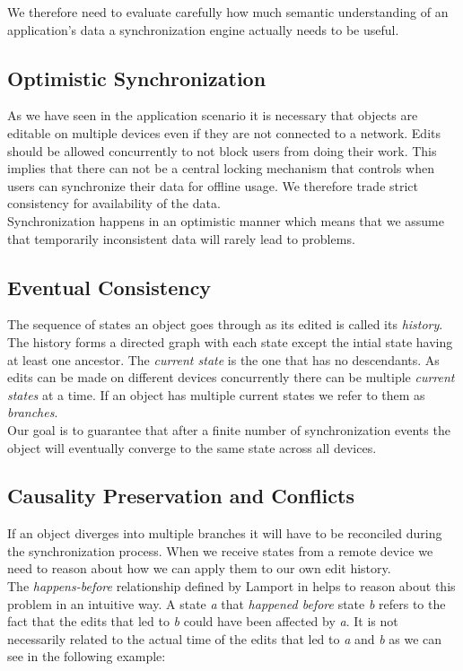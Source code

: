 We therefore need to evaluate carefully how much semantic understanding of an application's data a synchronization engine actually needs to be useful.

\subsection{Optimistic Synchronization}
As we have seen in the application scenario it is necessary that objects are editable on multiple devices even if they are not connected to a network. Edits should be allowed concurrently to not block users from doing their work. This implies that there can not be a central locking mechanism that controls when users can synchronize their data for offline usage. We therefore trade strict consistency for availability of the data.\\
Synchronization happens in an optimistic manner which means that we assume that temporarily inconsistent data will rarely lead to problems.

\subsection{Eventual Consistency}
The sequence of states an object goes through as its edited is called its \emph{history}. The history forms a directed graph with each state except the intial state having at least one ancestor. The \emph{current state} is the one that has no descendants. As edits can be made on different devices concurrently there can be multiple \emph{current states} at a time. If an object has multiple current states we refer to them as \emph{branches}.\\
Our goal is to guarantee that after a finite number of synchronization events the object will eventually converge to the same state across all devices.

\subsection{Causality Preservation and Conflicts}
If an object diverges into multiple branches it will have to be reconciled during the synchronization process. When we receive states from a remote device we need to reason about how we can apply them to our own edit history.\\
The \emph{happens-before} relationship defined by Lamport in \cite{Lamport:1978tr} helps to reason about this problem in an intuitive way. A state \emph{a} that \emph{happened before} state \emph{b} refers to the fact that the edits that led to \emph{b} could have been affected by \emph{a}. It is not necessarily related to the actual time of the edits that led to \emph{a} and \emph{b} as we can see in the following example:\\

